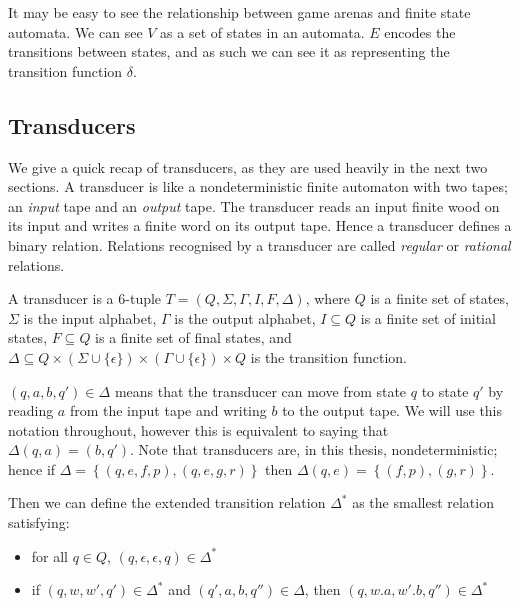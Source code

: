 \documentclass[10pt, a4paper]{report}
\begin{document}
It may be easy to see the relationship between game arenas and finite state
automata. We can see $V$ as a set of states in an automata. $E$ encodes the
transitions between states, and as such we can see it as representing the
transition function $\delta$.

\subsection{Transducers}
\label{sec:Transducers}

We give a quick recap of transducers, as they are used heavily in the next two
sections. A transducer is like a nondeterministic finite automaton with two
tapes; an \emph{input} tape and an \emph{output} tape. The transducer reads
an input finite wood on its input and writes a finite word on its output tape.
Hence a transducer defines a binary relation. Relations recognised by a
transducer are called \emph{regular} or \emph{rational} relations. 

A transducer is a 6-tuple $T = (Q, \Sigma, \Gamma, I, F, \Delta)$, where $Q$ is
a finite set of states, $\Sigma$ is the input alphabet, $\Gamma$ is the output
alphabet, $I \subseteq Q$ is a finite set of initial states, $F \subseteq Q$ is
a finite set of final states, and $\Delta \subseteq Q \times \left( \Sigma \cup
  \{\epsilon\} \right) \times \left( \Gamma \cup \{\epsilon\} \right) \times Q$
is the transition function.

$(q, a, b, q') \in \Delta$ means that the transducer can move from state $q$ to
state $q'$ by reading $a$ from the input tape and writing $b$ to the output
tape. We will use this notation throughout, however this is equivalent to saying
that $\Delta(q, a) = (b, q')$. Note that transducers are, in this thesis,
nondeterministic; hence if $\Delta = \left\{ (q, e, f, p), (q, e, g, r)
\right\}$ then $\Delta(q, e) = \left\{ (f, p), (g, r) \right\}$.

Then we can define the extended transition relation $\Delta^\ast$ as the
smallest relation satisfying:

\begin{itemize}
\item for all $q \in Q$, $(q, \epsilon, \epsilon, q) \in \Delta^\ast$
\item if $(q, w, w', q') \in \Delta^\ast$ and $(q', a, b, q'') \in \Delta$, then
  $(q, w . a, w' . b, q'') \in \Delta^\ast$
  
\end{itemize}
\end{document}
